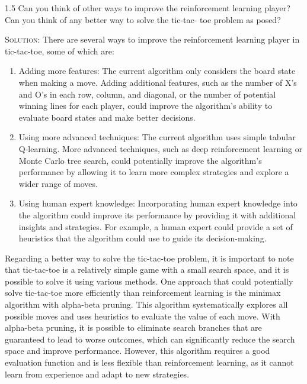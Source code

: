 \documentclass{article}
\begin{document}
1.5 Can you think of other ways to improve the reinforcement learning 
player? Can you think of any better way to solve the 
tic-tac- toe problem as posed?

\textsc{Solution:} There are several ways to improve the 
reinforcement learning player in tic-tac-toe, some of which are:
\begin{enumerate}
\item Adding more features: The current algorithm only considers 
the board state when making a move. Adding additional features, 
such as the number of X's and O's in each row, column, and diagonal, 
or the number of potential winning lines for each player, could 
improve the algorithm's ability to evaluate board states and make 
better decisions.

\item Using more advanced techniques: The current algorithm 
uses simple tabular Q-learning. More advanced techniques, such as 
deep reinforcement learning or Monte Carlo tree search, could 
potentially improve the algorithm's performance by 
allowing it to learn more complex strategies and explore a wider 
range of moves.

\item Using human expert knowledge: Incorporating human 
expert knowledge into the algorithm could improve its 
performance by providing it with additional insights and 
strategies. For example, a human expert could provide a set of 
heuristics that the algorithm could use to guide its 
decision-making.
\end{enumerate}

Regarding a better way to solve the tic-tac-toe problem, it is 
important to note that tic-tac-toe is a relatively simple game with a 
small search space, and it is possible to solve it using various 
methods. One approach that could potentially solve tic-tac-toe more 
efficiently than reinforcement learning is the minimax algorithm 
with alpha-beta pruning. This algorithm systematically explores 
all possible moves and uses heuristics to evaluate the value 
of each move. With alpha-beta pruning, it is possible to 
eliminate search branches that are guaranteed to lead to worse 
outcomes, which can significantly reduce the search space and 
improve performance. However, this algorithm requires a good 
evaluation function and is less flexible than reinforcement 
learning, as it cannot learn from experience and adapt to new 
strategies.
\end{document}
